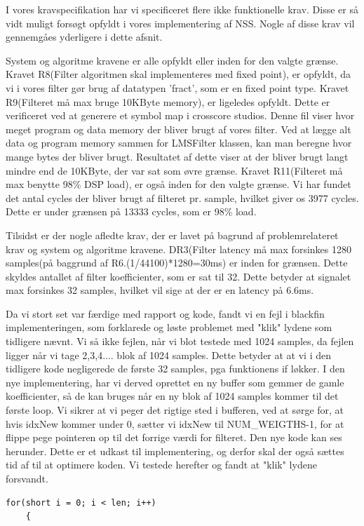 \begin{description}[align=left]
I vores kravspecifikation har vi specificeret flere ikke funktionelle krav. Disse er så vidt muligt forsøgt opfyldt i vores implementering af NSS. Nogle af disse krav vil gennemgåes yderligere i dette afsnit.

System og algoritme kravene er alle opfyldt eller inden for den valgte grænse. Kravet R8(Filter algoritmen skal implementeres med fixed point), er opfyldt, da vi i vores filter gør brug af datatypen 'fract', som er en fixed point type. Kravet R9(Filteret må max bruge 10KByte memory), er ligeledes opfyldt. Dette er verificeret ved at generere et symbol map i crosscore studios. Denne fil viser hvor meget program og data memory der bliver brugt af vores filter. Ved at lægge alt data og program memory sammen for LMSFilter klassen, kan man beregne hvor mange bytes der bliver brugt. Resultatet af dette viser at der bliver brugt langt mindre end de 10KByte, der var sat som øvre grænse. Kravet R11(Filteret må max benytte 98\% DSP load), er også inden for den valgte grænse. Vi har fundet det antal cycles der bliver brugt af filteret pr. sample, hvilket giver os 3977 cycles. Dette er under grænsen på 13333 cycles, som er 98\% load. 

Tilsidst er der nogle afledte krav, der er lavet på bagrund af problemrelateret krav og system og algoritme kravene. DR3(Filter latency må max forsinkes 1280 samples(på baggrund af R6.(1/44100)*1280=30ms) er inden for grænsen. Dette skyldes antallet af filter koefficienter, som er sat til 32. Dette betyder at signalet max forsinkes 32 samples, hvilket vil sige at der er en latency på 6.6ms. 

\item [Løsning i sidste time.] Da vi stort set var færdige med rapport og kode, fandt vi en fejl i blackfin implementeringen, som forklarede og løste problemet med "klik" lydene som tidligere nævnt. 
Vi så ikke fejlen, når vi blot testede med 1024 samples, da fejlen ligger når vi tage 2,3,4.... blok af 1024 samples. Dette betyder at at vi i den tidligere kode negligerede de første 32 samples, pga funktionens if løkker. I den nye implementering, har vi derved oprettet en ny buffer som gemmer de gamle koefficienter, så de kan bruges når en ny blok af 1024 samples kommer til det første loop. Vi sikrer at vi peger det rigtige sted i bufferen, ved at sørge for, at hvis idxNew kommer under 0, sætter vi idxNew til NUM\_WEIGTHS-1, for at flippe pege pointeren op til det forrige værdi for filteret. Den nye kode kan ses herunder. Dette er et udkast til implementering, og derfor skal der også sættes tid af til at optimere koden. Vi testede herefter og fandt at "klik" lydene forsvandt. 
\newpage
\begin{lstlisting}
for(short i = 0; i < len; i++)
	{


\end{lstlisting}
\end{description}
